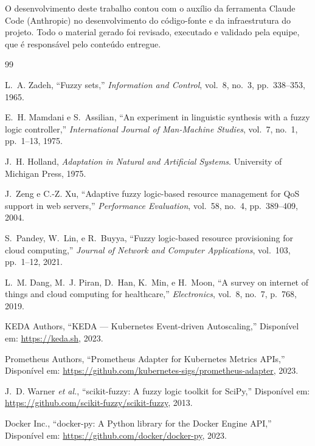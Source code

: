\documentclass[12pt, a4paper]{article}
\begin{document}
O desenvolvimento deste trabalho contou com o auxílio da ferramenta Claude Code (Anthropic) no desenvolvimento do código-fonte e da infraestrutura do projeto. Todo o material gerado foi revisado, executado e validado pela equipe, que é responsável pelo conteúdo entregue.

\newpage

\begin{thebibliography}{99}

  L.~A. Zadeh,
  ``Fuzzy sets,''
  \textit{Information and Control}, vol.~8, no.~3, pp.~338--353, 1965.

  E.~H. Mamdani e S.~Assilian,
  ``An experiment in linguistic synthesis with a fuzzy logic controller,''
  \textit{International Journal of Man-Machine Studies}, vol.~7, no.~1, pp.~1--13, 1975.

  J.~H. Holland,
  \textit{Adaptation in Natural and Artificial Systems}.
  University of Michigan Press, 1975.

  J.~Zeng e C.-Z. Xu,
  ``Adaptive fuzzy logic-based resource management for QoS support in web servers,''
  \textit{Performance Evaluation}, vol.~58, no.~4, pp.~389--409, 2004.

  S.~Pandey, W.~Lin, e R.~Buyya,
  ``Fuzzy logic-based resource provisioning for cloud computing,''
  \textit{Journal of Network and Computer Applications}, vol.~103, pp.~1--12, 2021.

  L.~M. Dang, M.~J. Piran, D.~Han, K.~Min, e H.~Moon,
  ``A survey on internet of things and cloud computing for healthcare,''
  \textit{Electronics}, vol.~8, no.~7, p.~768, 2019.

  KEDA Authors,
  ``KEDA — Kubernetes Event-driven Autoscaling,''
  Disponível em: \url{https://keda.sh}, 2023.

  Prometheus Authors,
  ``Prometheus Adapter for Kubernetes Metrics APIs,''
  Disponível em: \url{https://github.com/kubernetes-sigs/prometheus-adapter}, 2023.

  J.~D. Warner \textit{et al.},
  ``scikit-fuzzy: A fuzzy logic toolkit for SciPy,''
  Disponível em: \url{https://github.com/scikit-fuzzy/scikit-fuzzy}, 2013.

  Docker Inc.,
  ``docker-py: A Python library for the Docker Engine API,''
  Disponível em: \url{https://github.com/docker/docker-py}, 2023.

\end{thebibliography}
\end{document}
